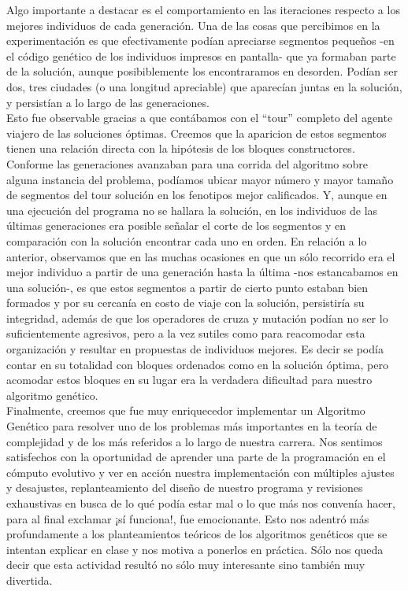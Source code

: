\documentclass[12pt]{article}
\begin{document}
Algo importante a destacar es el comportamiento en las iteraciones
respecto a los mejores individuos de cada generación. Una de las cosas que
percibimos en la experimentación es que efectivamente podían apreciarse
segmentos pequeños -en el código genético de los individuos impresos en pantalla-
que ya formaban parte de la solución, aunque posibiblemente los encontraramos
en desorden. Podían ser dos, tres ciudades (o una longitud apreciable) que
aparecían juntas en la solución,
y persistían a lo largo de las generaciones. \\

Esto fue observable gracias a que contábamos con el ``tour'' completo del
agente viajero de las soluciones óptimas. Creemos
que la aparicion de estos segmentos tienen una relación directa con la hipótesis
de los bloques constructores. Conforme las generaciones avanzaban para una
corrida del algoritmo sobre alguna instancia del problema, podíamos ubicar
mayor número y mayor tamaño de segmentos del tour solución en los fenotipos
mejor calificados. Y, aunque en una ejecución del programa no se hallara la solución,
en los individuos de las últimas generaciones era posible señalar el corte de
los segmentos y en comparación con la solución encontrar cada uno en orden.
En relación a lo anterior, observamos que en las muchas ocasiones en que
un sólo recorrido era el mejor individuo a partir de una generación hasta la última
-nos estancabamos en una solución-,
es que estos segmentos a partir de cierto punto estaban bien formados y por su cercanía
en costo de viaje con la solución, persistiría su integridad, además de que
los operadores de cruza y mutación podían no ser lo suficientemente agresivos,
pero a la vez sutiles como
para reacomodar esta organización y resultar en propuestas de individuos mejores.
Es decir se podía contar en su totalidad con bloques ordenados como en la solución
óptima, pero acomodar estos bloques en su lugar era la verdadera dificultad para nuestro
algoritmo genético. \\

Finalmente, creemos que fue muy enriquecedor implementar un Algoritmo Genético para
resolver
uno de los problemas más importantes en la teoría de complejidad y de los más
referidos a lo largo de nuestra carrera. Nos sentimos satisfechos con la oportunidad
de aprender una parte de la programación en el cómputo evolutivo y ver en acción
nuestra implementación con múltiples ajustes y desajustes, replanteamiento
del diseño de nuestro programa y revisiones exhaustivas en busca de lo qué podía
estar mal o lo que más nos convenía hacer, para al final exclamar ¡sí funciona!,
fue emocionante. Esto nos adentró más profundamente a
los planteamientos teóricos de los algoritmos genéticos que se intentan explicar
en clase y nos motiva a ponerlos en práctica. Sólo nos queda decir que esta actividad
resultó no sólo muy interesante sino también muy divertida.
\end{document}
